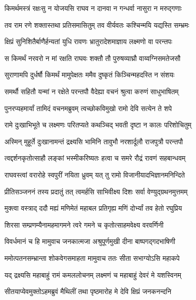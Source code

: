 \twolineshloka
{किमर्थमस्त्रं रक्षःसु न योजयसि राघव}
{न दानवा न गन्धर्वा नासुरा न मरुद्गणाः} %

\twolineshloka
{तव राम रणे शक्तास्तथा प्रतिसमासितुम्}
{तव वीर्यवतः कश्चिन्मयि यद्यस्ति सम्भ्रमः} %

\twolineshloka
{क्षिप्रं सुनिशितैर्बाणैर्हन्यतां युधि रावणः}
{भ्रातुरादेशमाज्ञाय लक्ष्मणो वा परन्तपः} %

\twolineshloka
{स किमर्थं नरवरो न मां रक्षति राघवः}
{शक्तौ तौ पुरुषव्याघ्रौ वाय्वग्निसमतेजसौ} %

\twolineshloka
{सुराणामपि दुर्धर्षौ किमर्थं मामुपेक्षतः}
{ममैव दुष्कृतं किञ्चिन्महदस्ति न संशयः} %

\twolineshloka
{समर्थौ सहितौ यन्मां न रक्षेते परन्तपौ}
{वैदेह्या वचनं श्रुत्वा करुणं साधुभाषितम्} %

\twolineshloka
{पुनरप्यहमार्यां तामिदं वचनमब्रुवम्}
{त्वच्छोकविमुखो रामो देवि सत्येन ते शपे} %

\twolineshloka
{रामे दुःखाभिभूते च लक्ष्मणः परितप्यते}
{कथञ्चिद् भवती दृष्टा न कालः परिशोचितुम्} %

\twolineshloka
{अस्मिन् मुहूर्ते दुःखानामन्तं द्रक्ष्यसि भामिनि}
{तावुभौ नरशार्दूलौ राजपुत्रौ परन्तपौ} %

\twolineshloka
{त्वद्दर्शनकृतोत्साहौ लङ्कां भस्मीकरिष्यतः}
{हत्वा च समरे रौद्रं रावणं सहबान्धवम्} %

\twolineshloka
{राघवस्त्वां वरारोहे स्वपुरीं नयिता ध्रुवम्}
{यत् तु रामो विजानीयादभिज्ञानमनिन्दिते} %

\twolineshloka
{प्रीतिसञ्जननं तस्य प्रदातुं तत् त्वमर्हसि}
{साभिवीक्ष्य दिशः सर्वा वेण्युद्ग्रथनमुत्तमम्} %

\twolineshloka
{मुक्त्वा वस्त्राद् ददौ मह्यं मणिमेतं महाबल}
{प्रतिगृह्य मणिं दोर्भ्यां तव हेतो रघुप्रिय} %

\twolineshloka
{शिरसा सम्प्रणम्यैनामहमागमने त्वरे}
{गमने च कृतोत्साहमवेक्ष्य वरवर्णिनी} %

\twolineshloka
{विवर्धमानं च हि मामुवाच जनकात्मजा}
{अश्रुपूर्णमुखी दीना बाष्पगद्गदभाषिणी} %

\twolineshloka
{ममोत्पतनसम्भ्रान्ता शोकवेगसमाहता}
{मामुवाच ततः सीता सभाग्योऽसि महाकपे} %

\twolineshloka
{यद् द्रक्ष्यसि महाबाहुं रामं कमललोचनम्}
{लक्ष्मणं च महाबाहुं देवरं मे यशस्विनम्} %

\twolineshloka
{सीतयाप्येवमुक्तोऽहमब्रुवं मैथिलीं तथा}
{पृष्ठमारोह मे देवि क्षिप्रं जनकनन्दनि} %

